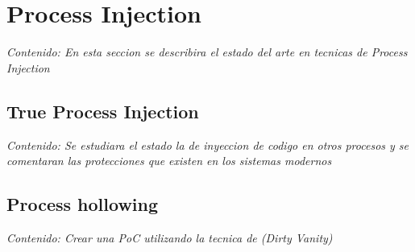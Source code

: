 \section{Process Injection}

\textit{Contenido: En esta seccion se describira el estado del arte en tecnicas de
Process Injection}
\vspace{1em}

\subsection{True Process Injection}

\textit{Contenido: Se estudiara el estado la de inyeccion de codigo en otros 
procesos y se comentaran las protecciones que existen en los sistemas modernos}
\vspace{1em}

\subsection{Process hollowing}

\textit{Contenido: Crear una PoC utilizando la tecnica de (Dirty Vanity)}
\vspace{1em}

